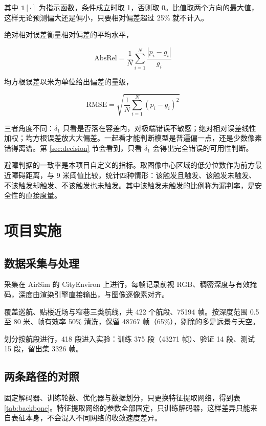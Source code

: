 \documentclass[12pt,a4paper]{ctexart}
\begin{document}
其中 $\mathbb{1}[\cdot]$ 为指示函数，条件成立时取 1，否则取 0。比值取两个方向的最大值，这样无论预测偏大还是偏小，只要相对偏差超过 25\% 就不计入。

绝对相对误差衡量相对偏差的平均水平，

\begin{equation}
\mathrm{AbsRel} = \frac{1}{N}\sum_{i=1}^{N}\frac{\left|p_i - g_i\right|}{g_i}
\label{eq:absrel}
\end{equation}

均方根误差以米为单位给出偏差的量级，

\begin{equation}
\mathrm{RMSE} = \sqrt{\frac{1}{N}\sum_{i=1}^{N}\left(p_i - g_i\right)^{2}}
\label{eq:rmse}
\end{equation}

三者角度不同：$\delta_1$ 只看是否落在容差内，对极端错误不敏感；绝对相对误差线性加权；均方根误差放大大偏差。一起看才能判断模型是普遍偏一点，还是少数像素错得离谱。第 \ref{sec:decision} 节会看到，只看 $\delta_1$ 会得出完全错误的可用性判断。

避障判据的一致率是本项目自定义的指标。取图像中心区域的低分位数作为前方最近障碍距离，与 9 米阈值比较，统计四种情形：该触发且触发、该触发未触发、不该触发却触发、不该触发也未触发。其中该触发未触发的比例称为漏判率，是安全性的直接度量。

\section{项目实施}
\label{sec:impl}

\subsection{数据采集与处理}

采集在 AirSim 的 CityEnviron 上进行，每帧记录前视 RGB、稠密深度与有效掩码，深度由渲染引擎直接输出，与图像逐像素对齐。

覆盖巡航、贴楼近场与窄巷三类航线，共 422 个航段、75194 帧。按深度范围 0.5 至 80 米、帧有效率 50\% 清洗，保留 48767 帧（65\%），剔除的多是远景与天空。

划分按航段进行，418 段进入实验：训练 375 段（43271 帧）、验证 14 段、测试 15 段，留出集 3326 帧。

\subsection{两条路径的对照}
\label{sec:compare}

固定解码器、训练轮数、优化器与数据划分，只更换特征提取网络，得到表 \ref{tab:backbone}。特征提取网络的参数全部固定，只训练解码器，这样差异只能来自表征本身，不会混入不同网络的收敛速度差异。
\end{document}
